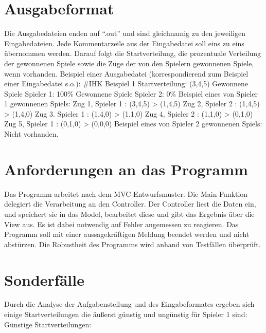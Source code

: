 \section{Ausgabeformat}
Die Ausgabedateien enden auf “.out” und sind gleichnamig zu den jeweiligen Eingabedateien.
Jede Kommentarzeile aus der Eingabedatei soll eins zu eins übernommen werden. Darauf
folgt die Startverteilung, die prozentuale Verteilung der gewonnenen Spiele sowie die Züge
der von den Spielern gewonnenen Spiele, wenn vorhanden.
Beispiel einer Ausgabedatei (korrespondierend zum Beispiel einer Eingabedatei s.o.): \newline
\newline
\#IHK Beispiel 1 \newline
Startverteilung: (3,4,5) \newline
Gewonnene Spiele Spieler 1: 100\% \newline
Gewonnene Spiele Spieler 2: 0\%	\newline
Beispiel eines von Spieler 1 gewonnenen Spiels:\newline
Zug 1, Spieler 1 : (3,4,5) > (1,4,5)    \newline
Zug 2, Spieler 2 : (1,4,5) > (1,4,0)    \newline
Zug 3. Spieler 1 : (1,4,0) > (1,1,0)    \newline
Zug 4, Spieler 2 : (1,1,0) > (0,1,0)	\newline
Zug 5, Spieler 1 : (0,1,0) > (0,0,0)	\newline
Beispiel eines von Spieler 2 gewonnenen Spiels: \newline
Nicht vorhanden.\newline

\section{Anforderungen an das Programm}
Das Programm arbeitet nach dem MVC-Entwurfsmuster.
Die Main-Funktion delegiert die Verarbeitung an den Controller. Der Controller liest die Daten ein, und speichert sie in das
Model, bearbeitet diese und gibt das Ergebnis über die View aus.
Es ist dabei notwendig auf Fehler angemessen zu reagieren. Das Programm soll mit einer aussagekräftigen Meldung beendet werden und nicht abstürzen. Die Robustheit des Programms wird anhand von Testfällen überprüft.



\section{Sonderfälle}
Durch die Analyse der Aufgabenstellung und des Eingabeformates ergeben sich einige
Startverteilungen die äußerst günstig und ungünstig für Spieler 1 sind:
Günstige Startverteilungen:

